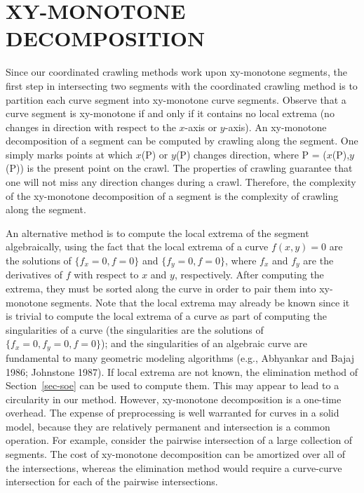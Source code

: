 \section{XY-MONOTONE DECOMPOSITION}
\label{sec-decomp}

Since our coordinated crawling methods work upon xy-monotone segments,
the first step in intersecting two segments with the coordinated crawling method is to
partition each curve segment into xy-monotone curve segments.
Observe that a curve segment is xy-monotone if and only if it contains 
no local extrema (no changes in direction with respect to the $x$-axis or $y$-axis).
An xy-monotone decomposition of a segment can be computed by crawling along the segment.
One simply marks points at which $x$(P) or $y$(P) changes direction,
where P = ($x$(P),$y$(P)) is the present point on the crawl.
The properties of crawling guarantee that one will not miss any direction changes during 
a crawl.
Therefore, the complexity of the xy-monotone decomposition of a segment is the
complexity of crawling along the segment.

An alternative method is to compute the local extrema of the segment algebraically,
using the fact that the local extrema of a curve $f(x,y)=0$ are the solutions of
\mbox{$\{f_{x}=0,f=0\}$} and \mbox{$\{f_{y}=0,f=0\}$},
where $f_{x}$ and $f_{y}$ are the derivatives of $f$ with respect to $x$ and $y$,
respectively.
After computing the extrema, they must be sorted along the curve 
in order to pair them into xy-monotone segments.
Note that the local extrema may already be known
since it is trivial to compute the local extrema of a curve as part of computing
the singularities of a curve (the singularities are the solutions of 
\mbox{$\{f_{x}=0,f_{y}=0,f=0\}$}); 
and the singularities of an algebraic curve are fundamental to
many geometric modeling algorithms (e.g., Abhyankar and Bajaj 1986; Johnstone 1987).
If local extrema are not known, the elimination method of Section~\ref{sec-soe}
can be used to compute them.
This may appear to lead to a circularity in our method.
However, xy-monotone decomposition is a one-time overhead.
The expense of preprocessing is well warranted for curves in a solid model,
because they are relatively permanent and intersection is a common operation.
For example, consider the pairwise intersection of a large collection of segments.
The cost of xy-monotone decomposition 
can be amortized over all of the intersections,
whereas the elimination method would require a curve-curve intersection
for each of the pairwise intersections.
%

